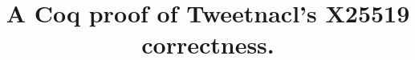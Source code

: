 \documentclass[conference]{IEEEtran}
\newif\ifpublic
\begin{document}
\date{}

\title{\Large \bf A Coq proof of Tweetnacl's X25519 correctness.}

\ifpublic
\author{
\IEEEauthorblockN{Peter Schwabe}
\IEEEauthorblockA{Radboud University,\\
The Netherlands}
\and
\IEEEauthorblockN{Beno\^it Viguier}
\IEEEauthorblockA{Radboud University,\\
The Netherlands}
\and
\IEEEauthorblockN{Timmy Weerwag}
\IEEEauthorblockA{XXX: Affiliation,\\
The Netherlands}
\and
\IEEEauthorblockN{Freek Wiedijk}
\IEEEauthorblockA{Radboud University,\\
The Netherlands}
}
\fi

\maketitle











\vspace*{1cm}
{\footnotesize 
}

\begin{appendix}
  
\end{appendix}
\end{document}
